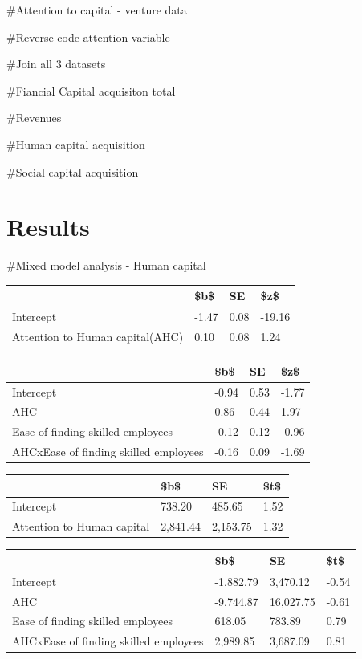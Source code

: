 \documentclass[
  english,
  man]{apa6}
\begin{document}
\#Attention to capital - venture data

\#Reverse code attention variable

\#Join all 3 datasets

\#Fiancial Capital acquisiton total

\#Revenues

\#Human capital acquisition

\#Social capital acquisition

\hypertarget{results}{%
\section{Results}\label{results}}

\#Mixed model analysis - Human capital

\begin{tabular}{l|l|l|l}
\hline
  & \$b\$ & SE & \$z\$\\
\hline
Intercept & -1.47 & 0.08 & -19.16\\
\hline
Attention to Human capital(AHC) & 0.10 & 0.08 & 1.24\\
\hline
\end{tabular}

\begin{tabular}{l|l|l|l}
\hline
  & \$b\$ & SE & \$z\$\\
\hline
Intercept & -0.94 & 0.53 & -1.77\\
\hline
AHC & 0.86 & 0.44 & 1.97\\
\hline
Ease of finding skilled employees & -0.12 & 0.12 & -0.96\\
\hline
AHCxEase of finding skilled employees & -0.16 & 0.09 & -1.69\\
\hline
\end{tabular}

\begin{tabular}{l|l|l|l}
\hline
  & \$b\$ & SE & \$t\$\\
\hline
Intercept & 738.20 & 485.65 & 1.52\\
\hline
Attention to Human capital & 2,841.44 & 2,153.75 & 1.32\\
\hline
\end{tabular}

\begin{tabular}{l|l|l|l}
\hline
  & \$b\$ & SE & \$t\$\\
\hline
Intercept & -1,882.79 & 3,470.12 & -0.54\\
\hline
AHC & -9,744.87 & 16,027.75 & -0.61\\
\hline
Ease of finding skilled employees & 618.05 & 783.89 & 0.79\\
\hline
AHCxEase of finding skilled employees & 2,989.85 & 3,687.09 & 0.81\\
\hline
\end{tabular}
\end{document}
